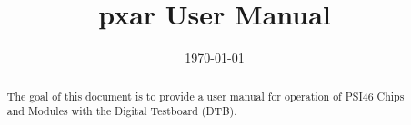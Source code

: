 \documentclass{scrartcl}
\title{pxar User Manual} %
\author{
} %
\date{\today} %
\begin{document}
\maketitle %


\begin{abstract}
The goal of this document is to provide a user manual for operation of
PSI46 Chips and Modules with the Digital Testboard (DTB).
\end{abstract}

\newpage
\tableofcontents

\newpage
\end{document}
